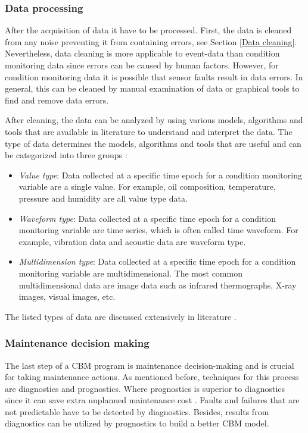 \subsubsection{Data processing}
After the acquisition of data it have to be processed. First, the data is cleaned from any noise preventing it from containing errors, see Section \ref{Data cleaning}. Nevertheless, data cleaning is more applicable to event-data than condition monitoring data since errors can be caused by human factors. However, for condition monitoring data it is possible that sensor faults result in data errors. In general, this can be cleaned by manual examination of data or graphical tools to find and remove data errors. 

After cleaning, the data can be analyzed by using various models, algorithms and tools that are available in literature to understand and interpret the data. The type of data determines the models, algorithms and tools that are useful and can be categorized into three groups \parencite{JARDINE2006}:
\begin{itemize}
\item \textit{Value type}: Data collected at a specific time epoch for a condition monitoring variable are a single value. For example, oil composition, temperature, pressure and humidity are all value type data.
\item \textit{Waveform type}: Data collected at a specific time epoch for a condition monitoring variable are time series, which is often called time waveform. For example, vibration data and acoustic data are waveform type.
\item \textit{Multidimension type}: Data collected at a specific time epoch for a condition monitoring variable are multidimensional. The most common multidimensional data are image data such as infrared thermographs, X-ray images, visual images, etc.
\end{itemize}
The listed types of data are discussed extensively in literature \parencite{WANG1993,Heger2004,ELLWEIN2002}.

\subsubsection{Maintenance decision making}
The last step of a CBM program is maintenance decision-making and is crucial for taking maintenance actions. As mentioned before, techniques for this process are diagnostics and prognostics. Where prognostics is superior to diagnostics since it can save extra unplanned maintenance cost \parencite{JARDINE2006}. Faults and failures that are not predictable have to be detected by diagnostics. Besides, results from diagnostics can be utilized by prognostics to build a better CBM model. 

